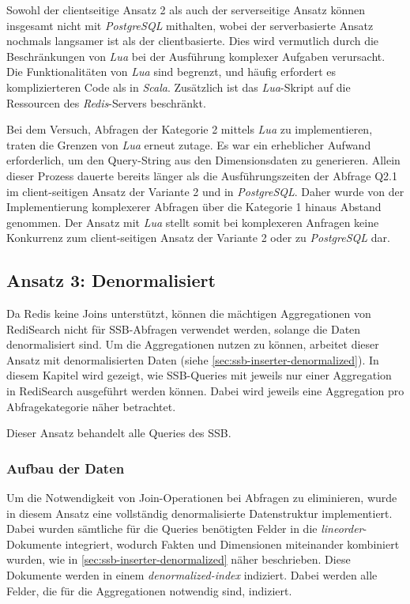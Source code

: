 Sowohl der clientseitige Ansatz 2 als auch der serverseitige Ansatz können insgesamt nicht mit \emph{PostgreSQL} mithalten, wobei der serverbasierte Ansatz nochmals langsamer ist als der clientbasierte. Dies wird vermutlich durch die Beschränkungen von \emph{Lua} bei der Ausführung komplexer Aufgaben verursacht. Die Funktionalitäten von \emph{Lua} sind begrenzt, und häufig erfordert es komplizierteren Code als in \emph{Scala}. Zusätzlich ist das \emph{Lua}-Skript auf die Ressourcen des \emph{Redis}-Servers beschränkt.

Bei dem Versuch, Abfragen der Kategorie 2 mittels \emph{Lua} zu implementieren, traten die Grenzen von \emph{Lua} erneut zutage. Es war ein erheblicher Aufwand erforderlich, um den Query-String aus den Dimensionsdaten zu generieren. Allein dieser Prozess dauerte bereits länger als die Ausführungszeiten der Abfrage Q2.1 im client-seitigen Ansatz der Variante 2 und in \emph{PostgreSQL}. Daher wurde von der Implementierung komplexerer Abfragen über die Kategorie 1 hinaus Abstand genommen. Der Ansatz mit \emph{Lua} stellt somit bei komplexeren Anfragen keine Konkurrenz zum client-seitigen Ansatz der Variante 2 oder zu \emph{PostgreSQL} dar.


\subsection{Ansatz 3: Denormalisiert}
Da Redis keine Joins unterstützt, können die mächtigen Aggregationen von RediSearch nicht für SSB-Abfragen verwendet werden, solange die Daten denormalisiert sind. Um die Aggregationen nutzen zu können, arbeitet dieser Ansatz mit denormalisierten Daten (siehe \cref{sec:ssb-inserter-denormalized}).
In diesem Kapitel wird gezeigt, wie SSB-Queries mit jeweils nur einer Aggregation in RediSearch ausgeführt werden können. Dabei wird jeweils eine Aggregation pro Abfragekategorie näher betrachtet.

Dieser Ansatz behandelt alle Queries des SSB.

\subsubsection{Aufbau der Daten}
Um die Notwendigkeit von Join-Operationen bei Abfragen zu eliminieren, wurde in diesem Ansatz eine vollständig denormalisierte Datenstruktur implementiert. Dabei wurden sämtliche für die Queries benötigten Felder in die \emph{lineorder}-Dokumente integriert, wodurch Fakten und Dimensionen miteinander kombiniert wurden, wie in \cref{sec:ssb-inserter-denormalized} näher beschrieben. Diese Dokumente werden in einem \emph{denormalized-index} indiziert. Dabei werden alle Felder, die für die Aggregationen notwendig sind, indiziert.

